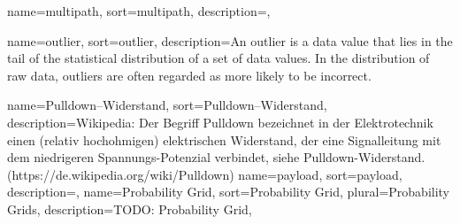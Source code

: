 {
	name={multipath}, sort={multipath},
	description={},
}


{
	name={outlier}, sort={outlier},
	description={An outlier is a data value that lies in the tail of the statistical distribution of a set of data values. In the distribution of raw data, outliers are often regarded as more likely to be incorrect.}
} %

{
	name={Pulldown--Widerstand},
	sort={Pulldown--Widerstand},
	description={Wikipedia: Der Begriff Pulldown bezeichnet in der Elektrotechnik einen (relativ hochohmigen) elektrischen Widerstand, der eine Signalleitung mit dem niedrigeren Spannungs-Potenzial verbindet, siehe Pulldown-Widerstand. (https://de.wikipedia.org/wiki/Pulldown)}
}
{
	name={payload}, sort={payload},
	description={},
}
{
	name={Probability Grid}, sort={Probability Grid}, plural={Probability Grids},
	description={TODO: Probability Grid},
}

